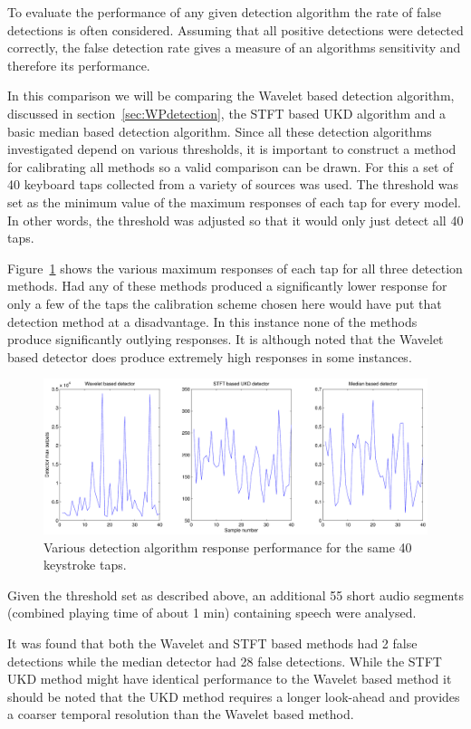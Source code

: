 To evaluate the performance of any given detection algorithm the rate of false detections is often considered. Assuming that all positive detections were detected correctly, the false detection rate gives a measure of an algorithms sensitivity and therefore its performance.

In this comparison we will be comparing the Wavelet based detection algorithm, discussed in section~\ref{sec:WPdetection}, the STFT based UKD algorithm\cite{Subramanya2007} and a basic median based detection algorithm. Since all these detection algorithms investigated depend on various thresholds, it is important to construct a method for calibrating all methods so a valid comparison can be drawn. For this a set of 40 keyboard taps collected from a variety of sources was used. The threshold was set as the minimum value of the maximum responses of each tap for every model. In other words, the threshold was adjusted so that it would only just detect all 40 taps.

Figure~\ref{fig:maxes.pdf} shows the various maximum responses of each tap for all three detection methods. Had any of these methods produced a significantly lower response for only a few of the taps the calibration scheme chosen here would have put that detection method at a disadvantage. In this instance none of the methods produce significantly outlying responses. It is although noted that the Wavelet based detector does produce extremely high responses in some instances.

\begin{figure} %
\centering
\includegraphics[width=120mm]{maxes.pdf}
\caption{Various detection algorithm response performance for the same 40 keystroke taps.}
\label{fig:maxes.pdf}
\end{figure}

Given the threshold set as described above, an additional 55 short audio segments (combined playing time of about 1 min) containing speech were analysed.

It was found that both the Wavelet and STFT based methods had 2 false detections while the median detector had 28 false detections. While the STFT UKD method might have identical performance to the Wavelet based method it should be noted that the UKD method requires a longer look-ahead and provides a coarser temporal resolution than the Wavelet based method.

